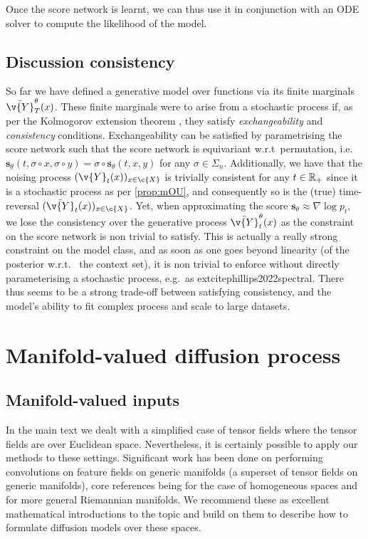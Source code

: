Once the score network is learnt, we can thus use it in conjunction with an ODE solver to compute the likelihood of the model.

\subsection{Discussion consistency}
\label{sec:consistency}
So far we have defined a generative model over functions via its finite marginals $\bar{\v{Y}}^\theta_T(x)$.
These finite marginals were to arise from a stochastic process if, as per the Kolmogorov extension theorem \parencite{oksendal2003stochastic}, they satisfy \emph{exchangeability} and \emph{consistency} conditions.
Exchangeability can be satisfied by parametrising the score network such that the score network is equivariant w.r.t\ permutation, i.e.\ $\mathbf{s}_\theta(t, \sigma \circ x, \sigma \circ {y}) = \sigma \circ \mathbf{s}_\theta(t, x, {y})$ for any $\sigma \in \Sigma_n$.
Additionally, we have that the noising process $({\v{Y}}_t(x))_{x \in \c{X}}$ is trivially consistent for any $t \in \mathbb{R}_+$ since it is a stochastic process as per \cref{prop:mOU}, and consequently so is the (true) time-reversal $(\bar{\v{Y}}_t(x))_{x \in \c{X}}$.
Yet, when approximating the score $\mathbf{s}_\theta \approx \nabla \log p_{t}$, we lose the consistency over the generative process $\bar{\v{Y}}^\theta_t(x)$ as the constraint on the score network is non trivial to satisfy.
This is actually a really strong constraint on the model class, and as soon as one goes beyond linearity (of the posterior w.r.t.
\ the context set), it is non trivial to enforce without directly parameterising a stochastic process, e.g.\ as extcite{phillips2022spectral}.
There thus seems to be a strong trade-off between satisfying consistency, and the model's ability to fit complex process and scale to large datasets.

\section{Manifold-valued diffusion process}
\label{sec:manifold_valued}

\subsection{Manifold-valued inputs}
\label{sec:manifold_valued_input}

In the main text we dealt with a simplified case of tensor fields where the tensor fields are over Euclidean space.
Nevertheless, it is certainly possible to apply our methods to these settings.
Significant work has been done on performing convolutions on feature fields on generic manifolds (a superset of tensor fields on generic manifolds), core references being \cite{cohen2021equivariant} for the case of homogeneous spaces and \cite{weiler2021coordinate} for more general Riemannian manifolds.
We recommend these as excellent mathematical introductions to the topic and build on them to describe how to formulate diffusion models over these spaces.

